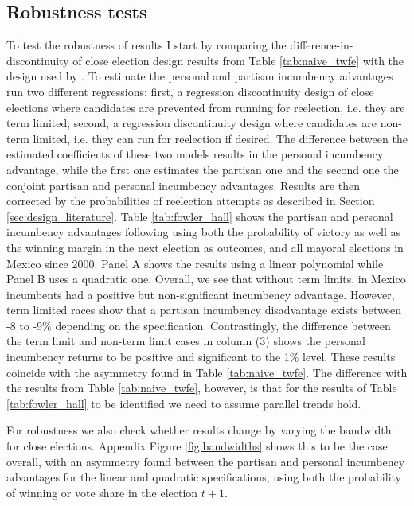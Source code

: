     
\subsection{Robustness tests \label{sec:robustness}} 
  
To test the robustness of results I start by comparing the difference-in-discontinuity of close election design results from Table \ref{tab:naive_twfe} with the design used by \citet{fowler_hall_2014}. To estimate the personal and partisan incumbency advantages \citet{fowler_hall_2014} run two different regressions: first, a regression discontinuity design of close elections where candidates are prevented from running for reelection, i.e. they are term limited; second, a regression discontinuity design where candidates are non-term limited, i.e. they can run for reelection if desired. The difference between the estimated coefficients of these two models results in the personal incumbency advantage, while the first one estimates the partisan one and the second one the conjoint partisan and personal incumbency advantages. Results are then corrected by the probabilities of reelection attempts as described in Section \ref{sec:design_literature}. Table \ref{tab:fowler_hall} shows the partisan and personal incumbency advantages following \citet{fowler_hall_2014} using both the probability of victory as well as the winning margin in the next election as outcomes, and all mayoral elections in Mexico since 2000. Panel A shows the results using a linear polynomial while Panel B uses a quadratic one. Overall, we see that without term limits, in Mexico incumbents had a positive but non-significant incumbency advantage. However, term limited races show that a partisan incumbency disadvantage exists between -8 to -9\% depending on the specification. Contrastingly, the difference between the term limit and non-term limit cases in column (3) shows the personal incumbency returns to be positive and significant to the 1\% level. These results coincide with the asymmetry found in Table \ref{tab:naive_twfe}. The difference with the results from Table \ref{tab:naive_twfe}, however, is that for the results of Table \ref{tab:fowler_hall} to be identified we need to assume parallel trends hold.   

   


For robustness we also check whether results change by varying the bandwidth for close elections. Appendix Figure \ref{fig:bandwidths} shows this to be the case overall, with an asymmetry found between the partisan and personal incumbency advantages for the linear and quadratic specifications, using both the probability of winning or vote share in the election $t+1$.       


